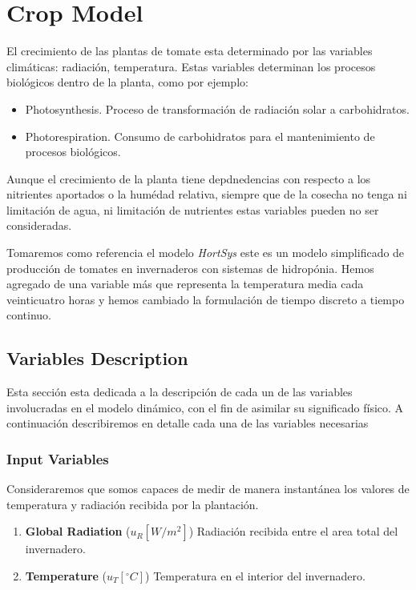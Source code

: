 \chapter{Crop Model}

    El crecimiento de las plantas de tomate esta determinado por las variables climáticas: radiación, temperatura. Estas variables determinan los procesos biológicos dentro de la planta, como por ejemplo: 

    \begin{itemize}
        \item Photosynthesis. Proceso de transformación de radiación solar a carbohidratos.
        \item Photorespiration. Consumo de carbohidratos para el mantenimiento de procesos biológicos.
    \end{itemize}

    Aunque el crecimiento de la planta tiene depdnedencias con respecto a los nitrientes aportados o la humédad relativa, siempre que de la cosecha no tenga ni limitación de agua, ni limitación de nutrientes estas variables pueden no ser consideradas. 

    Tomaremos como referencia el modelo \emph{HortSys} \cite{Martinez-Ruiz2019} este  es un modelo simplificado de producción de tomates en invernaderos con sistemas de hidropónia. Hemos agregado de una variable más que representa la temperatura media cada veinticuatro horas y hemos cambiado la formulación de tiempo discreto a tiempo continuo.


    \section{Variables Description}

    Esta sección esta dedicada a la descripción de cada un de las variables involucradas en el modelo dinámico, con el fin de asimilar su significado físico. A continuación describiremos en detalle cada una de las variables necesarias
    \subsection{Input Variables} 
    Consideraremos que somos capaces de medir de manera instantánea los valores de temperatura y radiación recibida por la plantación. 
    \begin{enumerate}
        \item \textbf{Global Radiation } ($u_R[W/m^2]$) Radiación recibida entre el area total del invernadero.
        \item \textbf{Temperature} ($u_T[^\circ C]$) Temperatura en el interior del invernadero.
    \end{enumerate}


